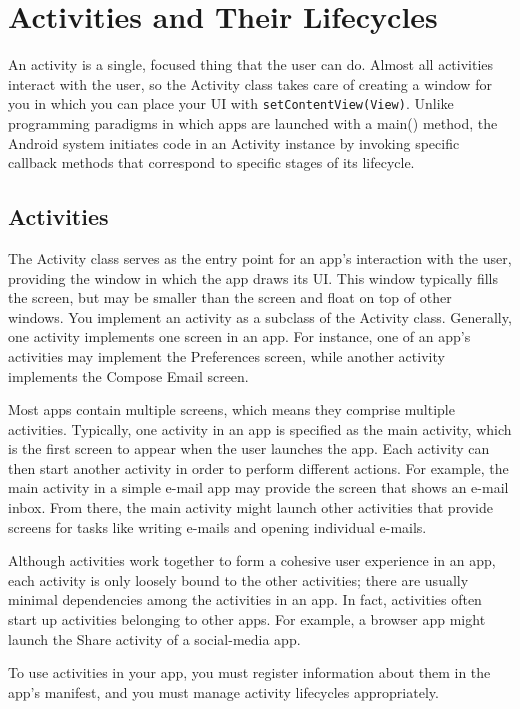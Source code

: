 
\chapter{Activities and Their Lifecycles}

An activity is a single, focused thing that the user can do. Almost all activities interact with the user, so the Activity class takes care of creating a window for you in which you can place your UI with \texttt{setContentView(View)}. Unlike programming paradigms in which apps are launched with a main() method, the Android system initiates code in an Activity instance by invoking specific callback methods that correspond to specific stages of its lifecycle.

\section{Activities}
The Activity class serves as the entry point for an app’s interaction with the user, providing the window in which the app draws its UI. This window typically fills the screen, but may be smaller than the screen and float on top of other windows. You implement an activity as a subclass of the Activity class. Generally, one activity implements one screen in an app. For instance, one of an app’s activities may implement the Preferences screen, while another activity implements the Compose Email screen.

Most apps contain multiple screens, which means they comprise multiple activities. Typically, one activity in an app is specified as the main activity, which is the first screen to appear when the user launches the app. Each activity can then start another activity in order to perform different actions. For example, the main activity in a simple e-mail app may provide the screen that shows an e-mail inbox. From there, the main activity might launch other activities that provide screens for tasks like writing e-mails and opening individual e-mails.

Although activities work together to form a cohesive user experience in an app, each activity is only loosely bound to the other activities; there are usually minimal dependencies among the activities in an app. In fact, activities often start up activities belonging to other apps. For example, a browser app might launch the Share activity of a social-media app.

To use activities in your app, you must register information about them in the app’s manifest, and you must manage activity lifecycles appropriately. 

